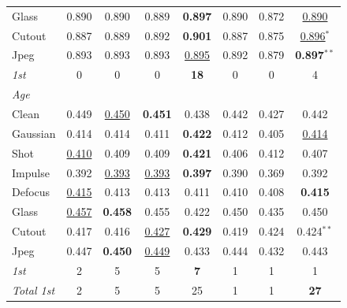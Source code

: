 \begin{table}[htbp]
\begin{tabular}{lccccccc}
Glass      & 0.890 & 0.890 & 0.889 & \textbf{0.897} & 0.890 & 0.872 & \underline{0.890} \\
Cutout     & 0.887 & 0.889 & 0.892 & \textbf{0.901} & 0.887 & 0.875 & \underline{0.896}$^{*}$ \\
Jpeg       & 0.893 & 0.893 & 0.893 & \underline{0.895} & 0.892 & 0.879 & \textbf{0.897}$^{**}$ \\
\textit{1st} & 0 & 0 & 0 & \textbf{18} & 0 & 0 & 4 \\
\midrule
\multicolumn{8}{l}{\textit{Age}} \\
Clean      & 0.449 & \underline{0.450} & \textbf{0.451} & 0.438 & 0.442 & 0.427 & 0.442 \\
Gaussian   & 0.414 & 0.414 & 0.411 & \textbf{0.422} & 0.412 & 0.405 & \underline{0.414} \\
Shot       & \underline{0.410} & 0.409 & 0.409 & \textbf{0.421} & 0.406 & 0.412 & 0.407 \\
Impulse    & 0.392 & \underline{0.393} & \underline{0.393} & \textbf{0.397} & 0.390 & 0.369 & 0.392 \\
Defocus    & \underline{0.415} & 0.413 & 0.413 & 0.411 & 0.410 & 0.408 & \textbf{0.415} \\
Glass      & \underline{0.457} & \textbf{0.458} & 0.455 & 0.422 & 0.450 & 0.435 & 0.450 \\
Cutout     & 0.417 & 0.416 & \underline{0.427} & \textbf{0.429} & 0.419 & 0.424 & 0.424$^{**}$ \\
Jpeg       & 0.447 & \textbf{0.450} & \underline{0.449} & 0.433 & 0.444 & 0.432 & 0.443 \\
\textit{1st} & 2 & 5 & 5 & \textbf{7} & 1 & 1 & 1 \\
\textit{Total 1st} & 2 & 5 & 5 & 25 & 1 & 1 & \textbf{27} \\
\bottomrule
\end{tabular}
\end{table}


